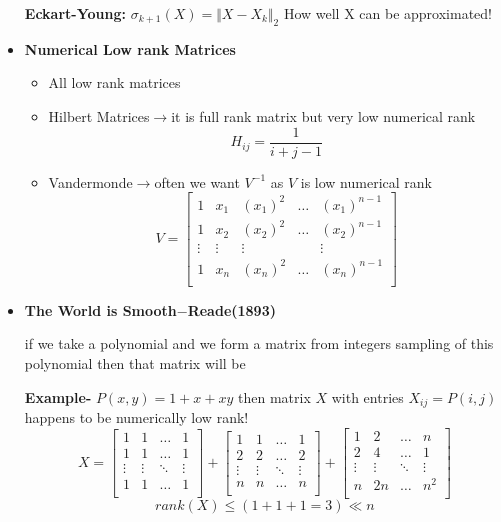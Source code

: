\documentclass[a4paper]{article}
\numberwithin{equation}{section}
\begin{document}
\begin{itemize}
\textbf{Eckart-Young: }$\sigma_{k+1}(X)=\Vert X-X_k \Vert_2$ How well X can be approximated!

\item \textbf{Numerical Low rank Matrices}
\begin{itemize}
    \item All low rank matrices
    \item Hilbert Matrices$\rightarrow$it is full rank matrix but very low numerical rank
    \[H_{ij}=\frac{1}{i+j-1}\]
    \item Vandermonde$\rightarrow$often we want $V^{-1}$ as $V$ is low numerical rank
    \[V=\begin{bmatrix}
        1&x_1&(x_1)^2&\dots&(x_1)^{n-1}\\
        1&x_2&(x_2)^2&\dots&(x_2)^{n-1}\\
        \vdots&\vdots&\vdots&&\vdots\\
        1&x_n&(x_n)^2&\dots&(x_n)^{n-1}\\
    \end{bmatrix}\]
\end{itemize}

\item \textbf{The World is Smooth$-$Reade(1893)}

if we take a polynomial and we form a matrix from integers sampling of this polynomial then that matrix will be 

\textbf{Example-} $P(x,y)=1+x+xy$ then matrix $X$ with entries $X_{ij}=P(i,j)$ happens to be numerically low rank! 
\[X=
\begin{bmatrix}
    1&1&\dots&1\\
    1&1&\dots&1\\
    \vdots&\vdots&\ddots&\vdots\\
    1&1&\dots&1\\
\end{bmatrix}+
\begin{bmatrix}
    1&1&\dots&1\\
    2&2&\dots&2\\
    \vdots&\vdots&\ddots&\vdots\\
    n&n&\dots&n\\
\end{bmatrix}+
\begin{bmatrix}
    1&2&\dots&n\\
    2&4&\dots&1\\
    \vdots&\vdots&\ddots&\vdots\\
    n&2n&\dots&n^2\\
\end{bmatrix}
\]
\[rank(X)\leq (1+1+1=3)\ll n\]


\end{itemize}
\end{document}
